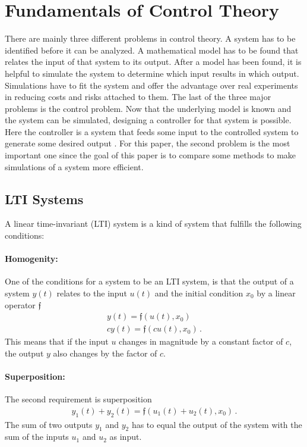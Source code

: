 \section{Fundamentals of Control Theory}
There are mainly three different problems in control theory.
A system has to be identified before it can be analyzed.
A mathematical model has to be found that relates the input of that system to its output.
After a model has been found, it is helpful to simulate the system to determine which input results in which output.
Simulations have to fit the system and offer the advantage over real experiments in reducing costs and risks attached to them.
The last of the three major problems is the control problem.
Now that the underlying model is known and the system can be simulated, designing a controller for that system is possible.
Here the controller is a system that feeds some input to the controlled system to generate some desired output \cite{DouglasBa}.
For this paper, the second problem is the most important one since the goal of this paper is to compare some methods to make simulations of a system more efficient.
\subsection{LTI Systems}
A linear time-invariant (LTI) system is a kind of system that fulfills the following conditions:
\paragraph{Homogenity:}
One of the conditions for a system to be an LTI system, is that the output of a system \(y(t)\) relates to the input \(u(t)\) and the initial condition \(x_0\) by a linear operator \(\mathfrak{f}\)
\begin{gather}
y(t) = \mathfrak{f}(u(t), x_0) \\
cy(t) = \mathfrak{f}(cu(t),  x_0) \,.
\end{gather}
This means that if the input \(u\) changes in magnitude by a constant factor of \(c\), the output \(y\) also changes by the factor of \(c\).
\paragraph{Superposition:}
The second requirement is superposition
\begin{gather}
y_1(t) + y_2(t) = \mathfrak{f}(u_1(t) + u_2(t), x_0) \,.
\end{gather}
The sum of two outputs \(y_1\) and \(y_2\) has to equal the output of the system with the sum of the inputs \(u_1\) and \(u_2\) as input.

